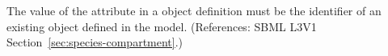 The value of the  attribute in a \Species object
definition must be the identifier of an existing \Compartment object
defined in the model.  (References: SBML L3V1
Section~\ref{sec:species-compartment}.)
